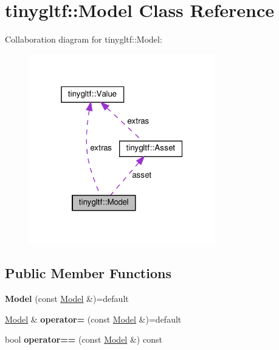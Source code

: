 \hypertarget{classtinygltf_1_1Model}{}\section{tinygltf\+:\+:Model Class Reference}
\label{classtinygltf_1_1Model}


Collaboration diagram for tinygltf\+:\+:Model\+:\nopagebreak
\begin{figure}[H]
\begin{center}
\leavevmode
\includegraphics[width=229pt]{classtinygltf_1_1Model__coll__graph}
\end{center}
\end{figure}
\subsection*{Public Member Functions}
\begin{DoxyCompactItemize}
\item 
\mbox{\label{classtinygltf_1_1Model_aeb55d3ce0be1982bd029b8b3dbd9d15e}} 
{\bfseries Model} (const \hyperlink{classtinygltf_1_1Model}{Model} \&)=default
\item 
\mbox{\label{classtinygltf_1_1Model_a7493a1125c4a7bdd70038530f892843a}} 
\hyperlink{classtinygltf_1_1Model}{Model} \& {\bfseries operator=} (const \hyperlink{classtinygltf_1_1Model}{Model} \&)=default
\item 
\mbox{\label{classtinygltf_1_1Model_a78b4fa3cbd11ada62287835f085de2bd}} 
bool {\bfseries operator==} (const \hyperlink{classtinygltf_1_1Model}{Model} \&) const
\end{DoxyCompactItemize}
